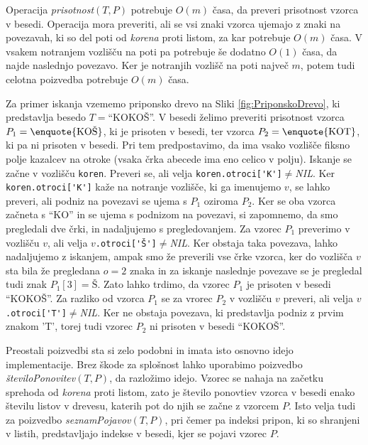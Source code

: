 Operacija \textit{prisotnost}$(T,P)$ potrebuje $O(m)$ časa, da preveri prisotnost vzorca v besedi. Operacija mora preveriti, ali se vsi znaki vzorca ujemajo z znaki na povezavah, ki so del poti od \textit{korena} proti listom, za kar potrebuje $O(m)$ časa. V vsakem notranjem vozlišču na poti pa potrebuje še dodatno $O(1)$ časa, da najde naslednjo povezavo. Ker je notranjih vozlišč na poti največ $m$, potem tudi celotna poizvedba potrebuje $O(m)$ časa.

Za primer iskanja vzememo priponsko drevo na Sliki \ref{fig:PriponskoDrevo}, ki predstavlja besedo $T=$\enquote{KOKOŠ}. V besedi želimo preveriti prisotnost vzorca $P_1=\text{\enquote{KOŠ}}$, ki je prisoten v besedi, ter vzorca $P_2=\text{\enquote{KOT}}$, ki pa ni prisoten v besedi. Pri tem predpostavimo, da ima vsako vozlišče fiksno polje kazalcev na otroke (vsaka črka abecede ima eno celico v polju). Iskanje se začne v vozlišču \verb|koren|. Preveri se, ali velja \verb|koren.otroci['K']|$\ne$\textit{NIL}. Ker \verb|koren.otroci['K']| kaže na notranje vozlišče, ki ga imenujemo $v$, se lahko preveri, ali podniz na povezavi se ujema s $P_1$ oziroma $P_2$. Ker se oba vzorca začneta s \enquote{KO} in se ujema s podnizom na povezavi, si zapomnemo, da smo pregledali dve črki, in nadaljujemo s pregledovanjem. Za vzorec $P_1$ preverimo v vozlišču $v$, ali velja $v$\verb|.otroci['Š']|$\ne$\textit{NIL}. Ker obstaja taka povezava, lahko nadaljujemo z iskanjem, ampak smo že preverili vse črke vzorca, ker do vozlišča $v$ sta bila že pregledana $o=2$ znaka in za iskanje naslednje povezave se je pregledal tudi znak $P_1[3]=\text{Š}$. Zato lahko trdimo, da vzorec $P_1$ je prisoten v besedi \enquote{KOKOŠ}. Za razliko od vzorca $P_1$ se za vrorec $P_2$ v vozlišču $v$ preveri, ali velja $v$\verb|.otroci['T']|$\ne$\textit{NIL}. Ker ne obstaja povezava, ki predstavlja podniz z prvim znakom 'T', torej tudi vzorec $P_2$ ni prisoten v besedi \enquote{KOKOŠ}.

Preostali poizvedbi sta si zelo podobni in imata isto osnovno idejo implementacije. Brez škode za splošnost lahko uporabimo poizvedbo \textit{številoPonovitev}$(T,P)$, da razložimo idejo. Vzorec se nahaja na začetku sprehoda od \textit{korena} proti listom, zato je število ponovtiev vzorca v besedi enako številu listov v drevesu, katerih pot do njih se začne z vzorcem $P$. Isto velja tudi za poizvedbo \textit{seznamPojavov}$(T,P)$, pri čemer pa indeksi pripon, ki so shranjeni v listih, predstavljajo indekse v besedi, kjer se pojavi vzorec $P$.

